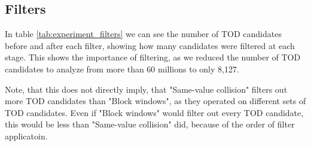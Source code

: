 \documentclass[draft,final]{vutinfth} %
\begin{document}
\subsection{Filters}

In table \ref{tab:experiment_filters} we can see the number of TOD candidates before and after each filter, showing how many candidates were filtered at each stage. This shows the importance of filtering, as we reduced the number of TOD candidates to analyze from more than 60 millions to only 8,127.

Note, that this does not directly imply, that "Same-value collision" filters out more TOD candidates than "Block windows", as they operated on different sets of TOD candidates. Even if "Block windows" would filter out every TOD candidate, this would be less than "Same-value collision" did, because of the order of filter applicatoin.
\end{document}
